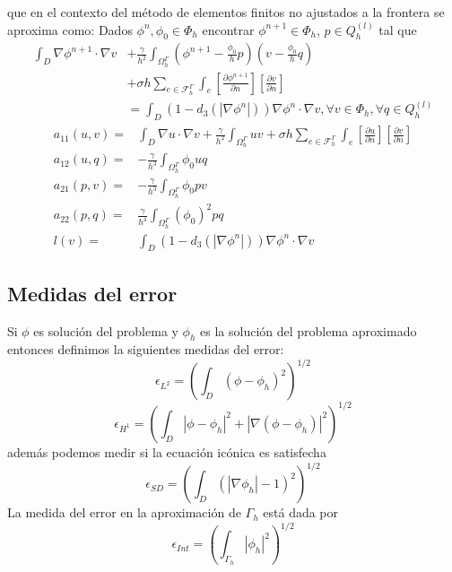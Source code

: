{\[	\]
	que en el contexto del método de elementos finitos no ajustados a la frontera se aproxima como: Dados  $\phi^{n}, \phi_0\in \Phi_h$ encontrar  $\phi^{n+1}\in \Phi_h$, $p\in Q_h^{(l)}$ tal que
	\[
	\begin{aligned}
		\int_D \nabla \phi^{n+1}\cdot \nabla v  &+ \frac{\gamma}{h^2} \int_{\Omega_h^\Gamma} \left( \phi^{n+1}  - \frac{\phi_{0}}{h}p \right)\left( v  - \frac{\phi_{0}}{h}q \right)\\
		&+\sigma h \sum_{e\in \mathcal{F}_h^\Gamma} \int_e \left[ \frac{\partial \phi^{n+1}}{\partial n} \right]
		\left[ \frac{\partial v}{\partial n} \right]\\
		&=
		\int_D \left(1-d_3\left(|\nabla \phi^{n}|\right)\right)\nabla \phi^{n}\cdot  \nabla v,\forall v\in  \Phi_h,\forall q\in Q_h^{(l)}
	\end{aligned}
	\]
	\begin{align}
		a_{11}(u,v)=& \int_D \nabla u\cdot \nabla v 
		+	 \frac{\gamma}{h^2} \int_{\Omega_h^\Gamma} uv
		+ \sigma h \sum_{e\in \mathcal{F}_h^\Gamma} \int_e \left[ \frac{\partial u}{\partial n} \right]
		\left[ \frac{\partial v}{\partial n} \right] \\
		a_{12}(u,q)=& - \frac{\gamma}{h^3} \int_{\Omega_h^\Gamma} \phi_0 u q\\
		a_{21}(p,v)=&   - \frac{\gamma}{h^3} \int_{\Omega_h^\Gamma} \phi_0 pv\\
		a_{22}(p,q)=& \frac{\gamma}{h^4} \int_{\Omega_h^\Gamma} (\phi_{0})^2pq  \\	
		l(v)= & 
		\int_D \left(1-d_3\left(|\nabla \phi^{n}|\right)\right)\nabla \phi^{n}\cdot  \nabla v
	\end{align}
	\subsection{Medidas del error}
	Si $\phi$ es solución del problema y $\phi_h$ es la solución del problema aproximado entonces definimos la siguientes medidas del error:
	\[
	\epsilon_{L^2}=\left( \int_D (\phi-\phi_h)^2 \right)^{1/2}
	\]
	\[
	\epsilon_{H^1}= \left( \int_D  |\phi-\phi_h|^2+|\nabla (\phi-\phi_h)|^2 \right)^{1/2}
	\]
	además podemos medir si la ecuación icónica es satisfecha
	\[
	\epsilon_{SD}= \left({\int_D (|\nabla \phi_h|-1)^2}
	\right)^{1/2}
	\]
	La medida del error en la aproximación de $\Gamma_h$ está dada por
	\[
	\epsilon_{Int}= \left({\int_{\Gamma_h} |\phi_h|^2}
	\right)^{1/2}
	\]
}
%	